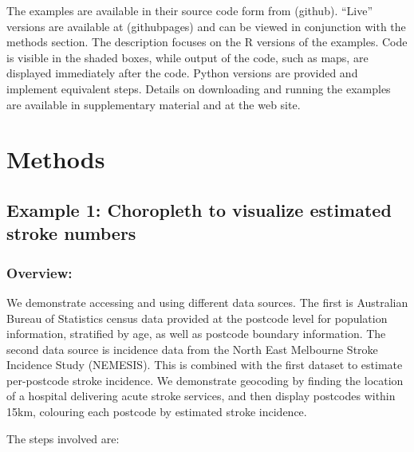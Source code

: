 \documentclass[]{article}
\begin{document}
The examples are available in their source code form from (github).
``Live'' versions are available at (githubpages) and can be viewed in
conjunction with the methods section. The description focuses on the R
versions of the examples. Code is visible in the shaded boxes, while
output of the code, such as maps, are displayed immediately after the
code. Python versions are provided and implement equivalent steps.
Details on downloading and running the examples are available in
supplementary material and at the web site.

\hypertarget{methods}{%
\section{Methods}\label{methods}}

\hypertarget{example-1-choropleth-to-visualize-estimated-stroke-numbers}{%
\subsection{Example 1: Choropleth to visualize estimated stroke
numbers}\label{example-1-choropleth-to-visualize-estimated-stroke-numbers}}

\hypertarget{overview}{%
\subsubsection{Overview:}\label{overview}}

We demonstrate accessing and using different data sources. The first is
Australian Bureau of Statistics census data provided at the postcode
level for population information, stratified by age, as well as postcode
boundary information. The second data source is incidence data from the
North East Melbourne Stroke Incidence Study (NEMESIS). This is combined
with the first dataset to estimate per-postcode stroke incidence. We
demonstrate geocoding by finding the location of a hospital delivering
acute stroke services, and then display postcodes within 15km, colouring
each postcode by estimated stroke incidence.

The steps involved are:
\end{document}

